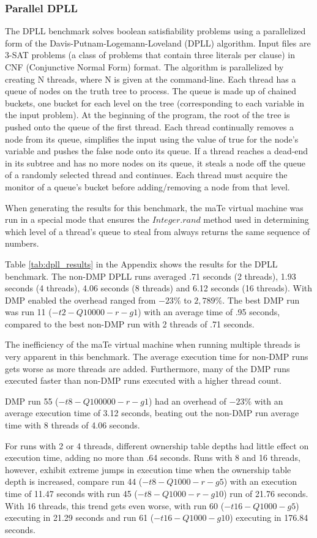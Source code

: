 \subsubsection{Parallel DPLL}

The DPLL benchmark solves boolean satisfiability problems using a
parallelized form of the Davis-Putnam-Logemann-Loveland (DPLL)
algorithm.  Input files are 3-SAT problems (a class of problems that
contain three literals per clause) in CNF (Conjunctive Normal Form)
format.  The algorithm is parallelized by creating N threads, where N
is given at the command-line.  Each thread has a queue of nodes on the
truth tree to process.  The queue is made up of chained buckets, one
bucket for each level on the tree (corresponding to each variable in
the input problem).  At the beginning of the program, the root of the
tree is pushed onto the queue of the first thread.  Each thread
continually removes a node from its queue, simplifies the input using
the value of true for the node's variable and pushes the false node
onto its queue.  If a thread reaches a dead-end in its subtree and has
no more nodes on its queue, it steals a node off the queue of a
randomly selected thread and continues.  Each thread must acquire the
monitor of a queue's bucket before adding/removing a node from that
level.

When generating the results for this benchmark, the maTe virtual
machine was run in a special mode that ensures the $Integer.rand$
method used in determining which level of a thread's queue to steal
from always returns the same sequence of numbers.

Table \ref{tab:dpll_results} in the Appendix shows the results for the
DPLL benchmark.  The non-DMP DPLL runs averaged .71 seconds (2
threads), 1.93 seconds (4 threads), 4.06 seconds (8 threads) and 6.12
seconds (16 threads).  With DMP enabled the overhead ranged from
$-23\%$ to $2,789\%$.  The best DMP run was run 11 ($-t2 -Q10000 -r
-g1$) with an average time of .95 seconds, compared to the best
non-DMP run with 2 threads of .71 seconds.

The inefficiency of the maTe virtual machine when running multiple
threads is very apparent in this benchmark.  The average execution
time for non-DMP runs gets worse as more threads are added.
Furthermore, many of the DMP runs executed faster than non-DMP runs
executed with a higher thread count.

DMP run 55 ($-t8 -Q100000 -r -g1$) had an overhead of $-23\%$ with an
average execution time of 3.12 seconds, beating out the non-DMP run
average time with 8 threads of 4.06 seconds.

For runs with 2 or 4 threads, different ownership table depths had
little effect on execution time, adding no more than .64 seconds.
Runs with 8 and 16 threads, however, exhibit extreme jumps in
execution time when the ownership table depth is increased, compare
run 44 ($-t8 -Q1000 -r -g5$) with an execution time of 11.47 seconds
with run 45 ($-t8 -Q1000 -r -g10$) run of 21.76 seconds.  With 16
threads, this trend gets even worse, with run 60 ($-t16 -Q1000 -g5$)
executing in 21.29 seconds and run 61 ($-t16 -Q1000 -g10$) executing
in 176.84 seconds.

